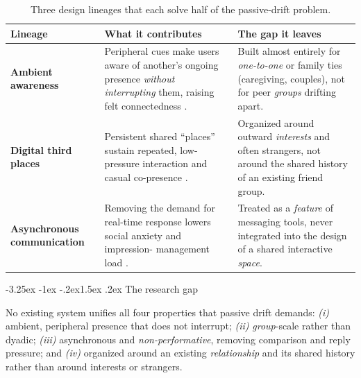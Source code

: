 \documentclass[11pt]{article}
\makeatletter
\renewcommand\subsection{\@startsection{subsection}{2}{\z@}%
  {-3.25ex \@plus -1ex \@minus -.2ex}{1.5ex \@plus .2ex}%
  {\normalfont\large\bfseries\color{accent}}}
\makeatother
\begin{document}
\begin{table}[t]
\centering
\caption{Three design lineages that each solve half of the passive-drift problem.}
\label{tab:lineages}
\small
\begin{tabularx}{\textwidth}{>{\bfseries}p{2.9cm} Y Y}
\toprule
Lineage & What it contributes & The gap it leaves \\
\midrule
Ambient awareness &
Peripheral cues make users aware of another's ongoing presence \emph{without
interrupting} them, raising felt connectedness \citep{deyguzman2006,
markopoulos2004, madianou2016}. &
Built almost entirely for \emph{one-to-one} or family ties (caregiving, couples),
not for peer \emph{groups} drifting apart. \\
Digital third places &
Persistent shared ``places'' sustain repeated, low-pressure interaction and
casual co-presence \citep{kim2025}. &
Organized around outward \emph{interests} and often strangers, not around the
shared history of an existing friend group. \\
Asynchronous communication &
Removing the demand for real-time response lowers social anxiety and impression-
management load \citep{high2009, stritzke2004}. &
Treated as a \emph{feature} of messaging tools, never integrated into the design
of a shared interactive \emph{space}. \\
\bottomrule
\end{tabularx}
\end{table}

\subsection{The research gap}

No existing system unifies all four properties that passive drift demands:
\emph{(i)} ambient, peripheral presence that does not interrupt; \emph{(ii)}
\emph{group}-scale rather than dyadic; \emph{(iii)} asynchronous and
\emph{non-performative}, removing comparison and reply pressure; and
\emph{(iv)} organized around an existing \emph{relationship} and its shared
history rather than around interests or strangers.
\end{document}
